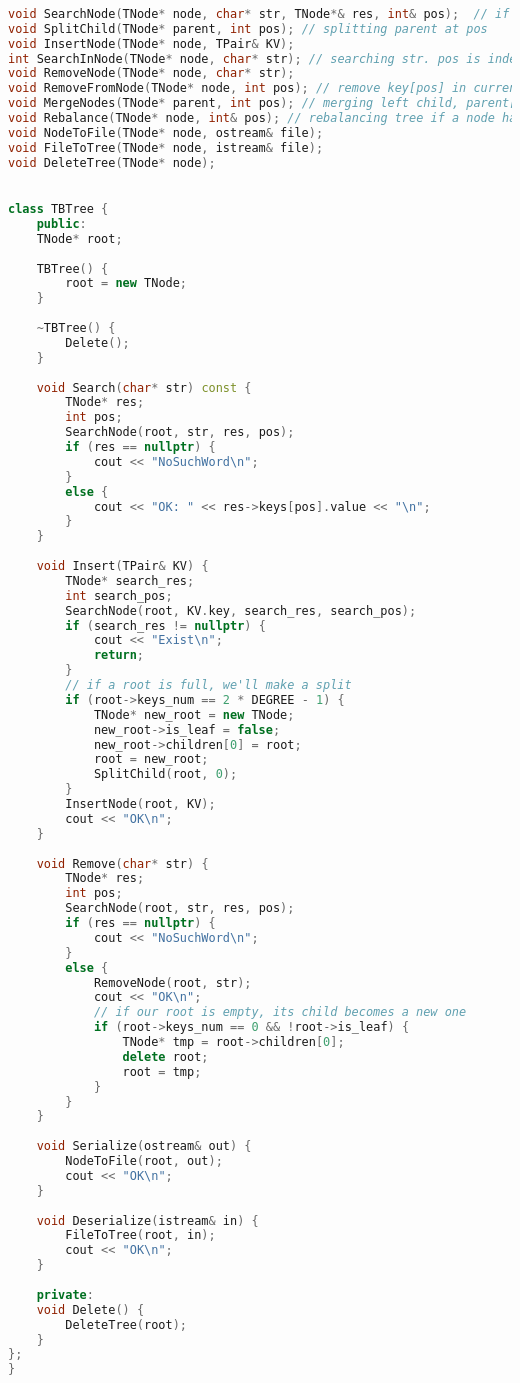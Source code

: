 \begin{lstlisting}[language=C++]
	
void SearchNode(TNode* node, char* str, TNode*& res, int& pos);  // if key not in tree, res will be nullptr
void SplitChild(TNode* parent, int pos); // splitting parent at pos
void InsertNode(TNode* node, TPair& KV);
int SearchInNode(TNode* node, char* str); // searching str. pos is index of str or index of a child with str
void RemoveNode(TNode* node, char* str);
void RemoveFromNode(TNode* node, int pos); // remove key[pos] in current node by making shifts
void MergeNodes(TNode* parent, int pos); // merging left child, parent[pos] and right child to left child
void Rebalance(TNode* node, int& pos); // rebalancing tree if a node has critical size
void NodeToFile(TNode* node, ostream& file);
void FileToTree(TNode* node, istream& file);
void DeleteTree(TNode* node);
	

class TBTree {
	public:
	TNode* root;
	
	TBTree() {
		root = new TNode;
	}
	
	~TBTree() {
		Delete();
	}
	
	void Search(char* str) const {
		TNode* res;
		int pos;
		SearchNode(root, str, res, pos);
		if (res == nullptr) {
			cout << "NoSuchWord\n";
		}
		else {
			cout << "OK: " << res->keys[pos].value << "\n";
		}
	}
	
	void Insert(TPair& KV) {
		TNode* search_res;
		int search_pos;
		SearchNode(root, KV.key, search_res, search_pos);
		if (search_res != nullptr) {
			cout << "Exist\n";
			return;
		}
		// if a root is full, we'll make a split
		if (root->keys_num == 2 * DEGREE - 1) {
			TNode* new_root = new TNode;
			new_root->is_leaf = false;
			new_root->children[0] = root;
			root = new_root;
			SplitChild(root, 0);
		}
		InsertNode(root, KV);
		cout << "OK\n";
	}
	
	void Remove(char* str) {
		TNode* res;
		int pos;
		SearchNode(root, str, res, pos);
		if (res == nullptr) {
			cout << "NoSuchWord\n";
		}
		else {
			RemoveNode(root, str);
			cout << "OK\n";
			// if our root is empty, its child becomes a new one
			if (root->keys_num == 0 && !root->is_leaf) {
				TNode* tmp = root->children[0];
				delete root;
				root = tmp;
			}
		}
	}
	
	void Serialize(ostream& out) {
		NodeToFile(root, out);
		cout << "OK\n";
	}
	
	void Deserialize(istream& in) {
		FileToTree(root, in);
		cout << "OK\n";
	}
	
	private:
	void Delete() {
		DeleteTree(root);
	}
};
}

	
\end{lstlisting}

